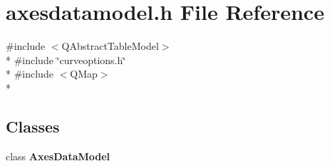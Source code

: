 \section{axesdatamodel.\+h File Reference}
\label{axesdatamodel_8h}
{\ttfamily \#include $<$Q\+Abstract\+Table\+Model$>$}\\*
{\ttfamily \#include \char`\"{}curveoptions.\+h\char`\"{}}\\*
{\ttfamily \#include $<$Q\+Map$>$}\\*
\subsection*{Classes}
\begin{DoxyCompactItemize}
\item 
class {\bf Axes\+Data\+Model}
\end{DoxyCompactItemize}
